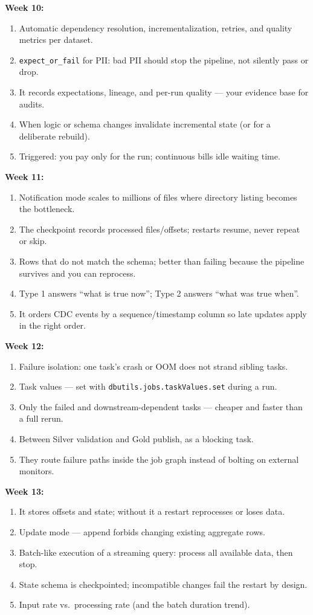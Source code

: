 \documentclass[11pt, a4paper]{article}
\begin{document}
\noindent\textbf{Week 10:}
\begin{enumerate}[itemsep=0pt, leftmargin=2em]
    \item Automatic dependency resolution, incrementalization, retries, and quality metrics per dataset.
    \item \texttt{expect\_or\_fail} for PII: bad PII should stop the pipeline, not silently pass or drop.
    \item It records expectations, lineage, and per-run quality --- your evidence base for audits.
    \item When logic or schema changes invalidate incremental state (or for a deliberate rebuild).
    \item Triggered: you pay only for the run; continuous bills idle waiting time.
\end{enumerate}
\noindent\textbf{Week 11:}
\begin{enumerate}[itemsep=0pt, leftmargin=2em]
    \item Notification mode scales to millions of files where directory listing becomes the bottleneck.
    \item The checkpoint records processed files/offsets; restarts resume, never repeat or skip.
    \item Rows that do not match the schema; better than failing because the pipeline survives and you can reprocess.
    \item Type 1 answers ``what is true now''; Type 2 answers ``what was true when''.
    \item It orders CDC events by a sequence/timestamp column so late updates apply in the right order.
\end{enumerate}
\noindent\textbf{Week 12:}
\begin{enumerate}[itemsep=0pt, leftmargin=2em]
    \item Failure isolation: one task's crash or OOM does not strand sibling tasks.
    \item Task values --- set with \texttt{dbutils.jobs.taskValues.set} during a run.
    \item Only the failed and downstream-dependent tasks --- cheaper and faster than a full rerun.
    \item Between Silver validation and Gold publish, as a blocking task.
    \item They route failure paths inside the job graph instead of bolting on external monitors.
\end{enumerate}
\noindent\textbf{Week 13:}
\begin{enumerate}[itemsep=0pt, leftmargin=2em]
    \item It stores offsets and state; without it a restart reprocesses or loses data.
    \item Update mode --- append forbids changing existing aggregate rows.
    \item Batch-like execution of a streaming query: process all available data, then stop.
    \item State schema is checkpointed; incompatible changes fail the restart by design.
    \item Input rate vs.\ processing rate (and the batch duration trend).
\end{enumerate}
\end{document}
